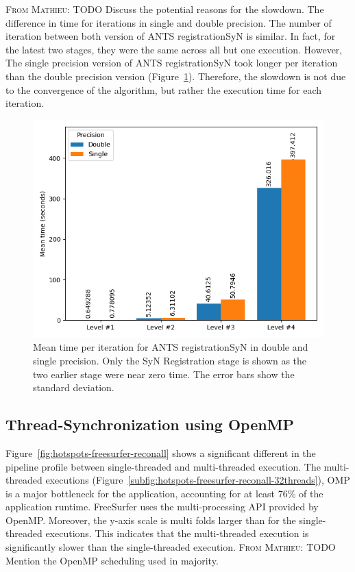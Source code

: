 \documentclass[conference]{IEEEtran}
\newcommand{\MD}[1]{\color{magenta}\textsc{From Mathieu: }#1\color{black}}
\begin{document}
\MD{TODO Discuss the potential reasons for the slowdown. The difference in time for iterations in single and double precision.}
The number of iteration between both version of ANTS registrationSyN is similar. In fact, for the latest two stages, they were the same across all but one execution. However, The single precision version of ANTS registrationSyN took longer per iteration than the double precision version (Figure~\ref{fig:mean-time-per-iteration-ants}). Therefore, the slowdown is not due to the convergence of the algorithm, but rather the execution time for each iteration.
\begin{figure}
	\includegraphics[width=\linewidth]{figures/ants-registrationSyN-iteration-mean.png}
	\caption{Mean time per iteration for ANTS registrationSyN in double and single precision. Only the SyN Registration stage is shown as the two earlier stage were near zero time. The error bars show the standard deviation.}
	\label{fig:mean-time-per-iteration-ants}
\end{figure}
			
\subsection{Thread-Synchronization using OpenMP}
Figure~\ref{fig:hotspots-freesurfer-reconall} shows a significant different in the pipeline profile between single-threaded and multi-threaded execution. The multi-threaded executions (Figure~\ref{subfig:hotspots-freesurfer-reconall-32threads}), OMP is a major bottleneck for the application, accounting for at least 76\% of the application runtime. FreeSurfer uses the multi-processing API provided by OpenMP. Moreover, the y-axis scale is multi folds larger than for the single-threaded executions. This indicates that the multi-threaded execution is significantly slower than the single-threaded execution.
\MD{TODO Mention the OpenMP scheduling used in majority.}
		
\end{document}
